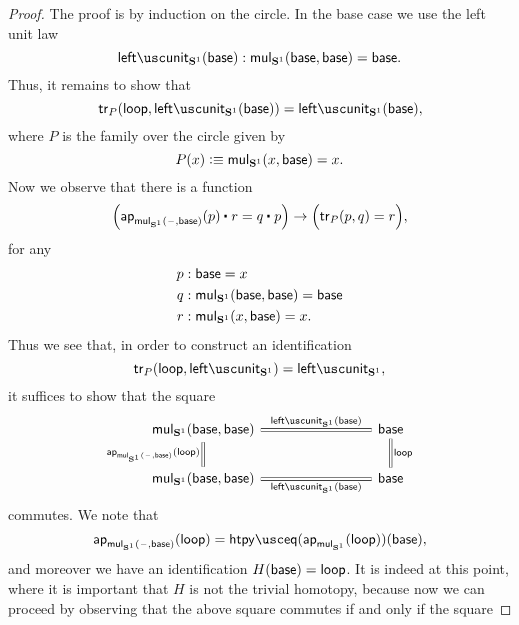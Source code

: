 \begin{proof}
  The proof is by induction on the circle. In the base case we use the left unit law
  \begin{equation*}
    \leftunit_{\sphere{1}}(\base):\mulcircle(\base,\base)=\base.
  \end{equation*}
  Thus, it remains to show that
  \begin{equation*}
    \tr_P(\lloop,\leftunit_{\sphere{1}}(\base))=\leftunit_{\sphere{1}}(\base),
  \end{equation*}
  where $P$ is the family over the circle given by
  \begin{equation*}
    P(x) \vcentcolon\equiv \mathsf{mul}_{\mathbf{S}^{1}}(x,\mathsf{base})=x.
  \end{equation*}
  Now we observe that there is a function
  \begin{equation*}
    \Big(\ct{\ap{\mulcircle(\blank,\base)}{p}}{r}=\ct{q}{p}\Big)\to\Big(\tr_{P}(p,q)=r\Big),
  \end{equation*}
  for any
  \begin{align*}
    p & : \mathsf{base}=x \\
    q & : \mathsf{mul}_{\mathbf{S}^{1}}(\mathsf{base},\mathsf{base})=\mathsf{base} \\
    r & : \mathsf{mul}_{\mathbf{S}^{1}}(x,\mathsf{base})=x.
  \end{align*}
  Thus we see that, in order to construct an identification
  \begin{equation*}
    \tr_{P}(\lloop,\leftunit_{\sphere{1}})=\leftunit_{\sphere{1}},
  \end{equation*}
  it suffices to show that the square
  \begin{equation*}
    \begin{tikzcd}[column sep=8em]
      \mulcircle(\base,\base) \arrow[d,equals,swap,"\ap{\mulcircle(\blank,\base)}{\lloop}"] \arrow[r,equals,"\leftunit_{\sphere{1}}(\base)"] & \base \arrow[d,equals,"\lloop"] \\
      \mulcircle(\base,\base) \arrow[r,equals,swap,"\leftunit_{\sphere{1}}(\base)"] & \base
    \end{tikzcd}
  \end{equation*}
  commutes. We note that
  \begin{equation*}
    \ap{\mulcircle(\blank,\base)}{\lloop} = \htpyeq(\ap{\mulcircle}{\lloop})(\base),
  \end{equation*}
  and moreover we have an identification $H(\mathsf{base})=\mathsf{loop}$. It is indeed at this point, where it is important that $H$ is not the trivial homotopy, because now we can proceed by observing that the above square commutes if and only if the square

\end{proof}
